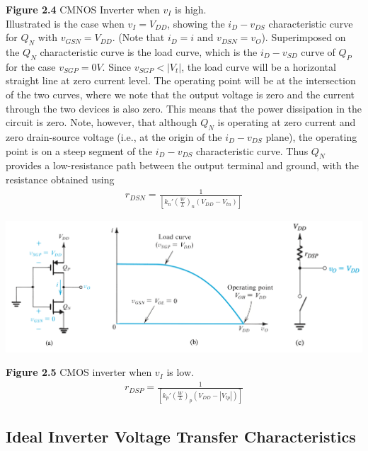 \documentclass[12pt]{article}
\begin{document}
    \textbf{Figure 2.4} CMNOS Inverter when $v_I$ is high.\\[\baselineskip]
    Illustrated is the case when $v_I = V_{DD}$, showing the $i_D-v_{DS}$ characteristic curve 
    for $Q_N$ with $v_{GSN} = V_{DD}$. (Note that $i_D = i$ and $v_{DSN} = v_O$). Superimposed 
    on the $Q_N$ characteristic curve is the load curve, which is the $i_D-v_{SD}$ curve of $Q_P$
    for the case $v_{SGP} = 0 V$. Since $v_{SGP} < |V_t|$, the load curve will be a horizontal 
    straight line at zero current level. The operating point will be at the intersection of the 
    two curves, where we note that the output voltage is zero and the current through the two 
    devices is also zero. This means that the power dissipation in the circuit is zero. Note, 
    however, that although $Q_N$ is operating at zero current and zero drain-source voltage 
    (i.e., at the origin of the $i_D-v_{DS}$ plane), the operating point is on a steep segment 
    of the $i_D-v_{DS}$ characteristic curve. Thus $Q_N$ provides a low-resistance path between 
    the output terminal and ground, with the resistance obtained using
    \begin{align}
        r_{DSN} = \frac{1}{[k_n'(\frac{W}{L})_n(V_{DD}-V_{tn})]}  
    \end{align}

    \begin{center}
        \includegraphics[scale=0.45]{figures/fig12.png}
    \end{center}
    \textbf{Figure 2.5} CMOS inverter when $v_I$ is low.\\
    
    \begin{align}
        r_{DSP} = \frac{1}{\left[k_p'(\frac{W}{L})_p(V_{DD}-|V_{tp}|)\right]}
    \end{align}

    \subsection*{Ideal Inverter Voltage Transfer Characteristics}
\end{document}
